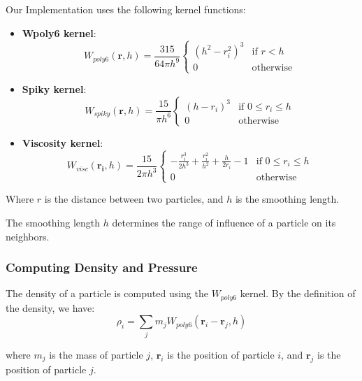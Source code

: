 \documentclass[a4paper]{article}
\begin{document}
Our Implementation uses the following kernel functions:
\begin{itemize}
  \item \textbf{Wpoly6 kernel}:
    \begin{equation}
      \nonumber
      W_{poly6}(\mathbf{r}, h) = \frac{315}{64 \pi h^9} \begin{cases}
        (h^2 - r_i^2)^3 & \text{if } r < h \\
        0 & \text{otherwise}
      \end{cases}
    \end{equation}
  \item \textbf{Spiky kernel}:
    \begin{equation}
    \nonumber
      W_{spiky}(\mathbf{r}, h) = \frac{15}{\pi h^6} \begin{cases}
        (h - r_i)^3 & \text{if } 0 \le r_i \le h \\
        0 & \text{otherwise}
      \end{cases}
    \end{equation}
  \item \textbf{Viscosity kernel}:
    \begin{equation}
    \nonumber
      W_{visc}(\mathbf{r_i}, h) = \frac{15}{2 \pi h^3} \begin{cases}
        -\frac{r_i^3}{2h^3} + \frac{r_i^2}{h^2} + \frac{h}{2r_i} - 1 & \text{if } 0 \le r_i \le h \\
        0 & \text{otherwise}
      \end{cases}
    \end{equation}
\end{itemize}

Where $r$ is the distance between two particles, and $h$ is the smoothing length.

The smoothing length $h$ determines the range of influence of a particle on its neighbors.

\subsubsection{Computing Density and Pressure}

The density of a particle is computed using the $W_{poly6}$ kernel. By the definition of the density, we have:
\[
  \rho_i = \sum_{j}m_j W_{poly6}(\mathbf{r}_i - \mathbf{r}_j, h)
\]

where $m_j$ is the mass of particle $j$, $\mathbf{r}_i$ is the position of particle $i$, and $\mathbf{r}_j$ is the position of particle $j$.
\end{document}
